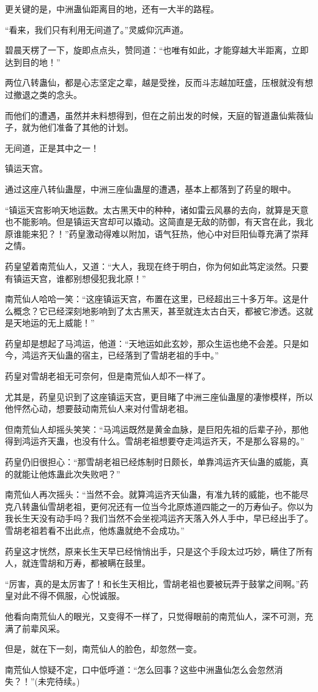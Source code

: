 \begin{this_body}
更关键的是，中洲蛊仙距离目的地，还有一大半的路程。

“看来，我们只有利用无间道了。”灵威仰沉声道。

碧晨天楞了一下，旋即点点头，赞同道：“也唯有如此，才能穿越大半距离，立即达到目的地！”

两位八转蛊仙，都是心志坚定之辈，越是受挫，反而斗志越加旺盛，压根就没有想过撤退之类的念头。

而他们的遭遇，虽然并未料想得到，但在之前出发的时候，天庭的智道蛊仙紫薇仙子，就为他们准备了其他的计划。

无间道，正是其中之一！

镇运天宫。

通过这座八转仙蛊屋，中洲三座仙蛊屋的遭遇，基本上都落到了药皇的眼中。

“镇运天宫影响天地运数。太古黑天中的种种，诸如雷云风暴的去向，就算是天意也不能影响。但是镇运天宫却可以撬动。这简直是无敌的防御，有天宫在此，我北原谁能来犯？！”药皇激动得难以附加，语气狂热，他心中对巨阳仙尊充满了崇拜之情。

药皇望着南荒仙人，又道：“大人，我现在终于明白，你为何如此笃定淡然。只要有镇运天宫，谁都别想侵犯我北原！”

南荒仙人哈哈一笑：“这座镇运天宫，布置在这里，已经超出三十多万年。这是什么概念？它已经深刻地影响到了太古黑天，甚至就连太古白天，都被它渗透。这就是天地运的无上威能！”

药皇却是想起了马鸿运，他道：“天地运如此玄妙，那众生运也绝不会差。只是如今，鸿运齐天仙蛊的宿主，已经落到了雪胡老祖的手中。”

药皇对雪胡老祖无可奈何，但是南荒仙人却不一样了。

尤其是，药皇见识到了这座镇运天宫，更目睹了中洲三座仙蛊屋的凄惨模样，所以他怦然心动，想要鼓动南荒仙人来对付雪胡老祖。

但南荒仙人却摇头笑笑：“马鸿运既然是黄金血脉，是巨阳先祖的后辈子孙，那他得到鸿运齐天蛊，也没有什么。雪胡老祖想要夺走鸿运齐天，不是那么容易的。”

药皇仍旧很担心：“那雪胡老祖已经炼制时日颇长，单靠鸿运齐天仙蛊的威能，真的就能让他炼蛊此次失败吧？”

南荒仙人再次摇头：“当然不会。就算鸿运齐天仙蛊，有准九转的威能，也不能尽克八转蛊仙雪胡老祖，更何况还有一位当今北原炼道四能之一的万寿仙子。你以为我长生天没有动手吗？我们当然不会坐视鸿运齐天落入外人手中，早已经出手了。雪胡老祖若看不出此点，他炼蛊就绝不会成功。”

药皇这才恍然，原来长生天早已经悄悄出手，只是这个手段太过巧妙，瞒住了所有人，就连雪胡和万寿，都被瞒在鼓里。

“厉害，真的是太厉害了！和长生天相比，雪胡老祖也要被玩弄于鼓掌之间啊。”药皇对此不得不佩服，心悦诚服。

他看向南荒仙人的眼光，又变得不一样了，只觉得眼前的南荒仙人，深不可测，充满了前辈风采。

但是，就在下一刻，南荒仙人的脸色，却忽然一变。

南荒仙人惊疑不定，口中低呼道：“怎么回事？这些中洲蛊仙怎么会忽然消失？！”(未完待续。)

\end{this_body}

